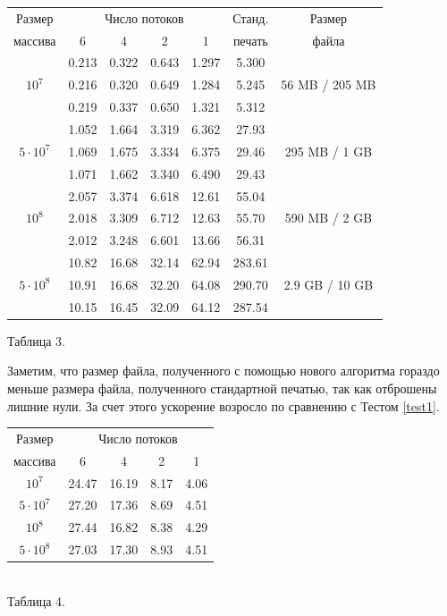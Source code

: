 \begin{center}
\begin{longtable}{||c|c|c|c|c|c|c||}
\hline
\hline
Размер & \multicolumn{4}{c|}{Число потоков} & Станд. & Размер\\
\hhline{~|-|-|-|-|~|~|}
массива & 6  & 4 & 2 & 1 & печать & файла\\
\hline
\hline
 & 0.213 & 0.322 & 0.643 & 1.297 & 5.300  &\\
\hhline{~|-|-|-|-|-|}
$10^7$ & 0.216 & 0.320 & 0.649 & 1.284 & 5.245  &56 MB / 205 MB \\
\hhline{~|-|-|-|-|-|}
 & 0.219 & 0.337 & 0.650 & 1.321 & 5.312  &\\
\hline
& 1.052 & 1.664 & 3.319 & 6.362 & 27.93  &\\
\hhline{~|-|-|-|-|-|}
$5 \cdot 10^7$& 1.069  & 1.675 & 3.334 & 6.375 & 29.46  &295 MB / 1 GB\\
\hhline{~|-|-|-|-|-|}
& 1.071  & 1.662 & 3.340 & 6.490 & 29.43  &\\
\hline
 & 2.057 &  3.374 & 6.618 & 12.61 & 55.04 & \\
\hhline{~|-|-|-|-|-|}
$10^8$ & 2.018 & 3.309 & 6.712 & 12.63 & 55.70  & 590 MB / 2 GB \\
\hhline{~|-|-|-|-|-|}
 & 2.012 & 3.248 & 6.601 & 13.66 & 56.31  &\\
\hline
 & 10.82 & 16.68 & 32.14 & 62.94 & 283.61  &\\
\hhline{~|-|-|-|-|-|}
$5 \cdot 10^8$ & 10.91 & 16.68 & 32.20 & 64.08 & 290.70  &2.9 GB / 10 GB\\
\hhline{~|-|-|-|-|-|}
 & 10.15 & 16.45 & 32.09 & 64.12 & 287.54  &\\
\hline
\hline
\end{longtable}
\small{Таблица 3.}
\end{center}

Заметим, что размер файла, полученного с помощью нового алгоритма гораздо меньше размера файла, полученного стандартной печатью, так как отброшены лишние нули.
За счет этого ускорение возросло по сравнению с Тестом \ref{test1}.

\begin{center}
\begin{tabular}{||c|c|c|c|c||}
\hline
\hline
Размер & \multicolumn{4}{c|}{Число потоков}\\
\hhline{~|-|-|-|-|}
массива & 6 & 4 & 2 & 1 \\
\hline
$10^7$  & 24.47  & 16.19 & 8.17 & 4.06 \\
\hline
$5 \cdot 10^7$ & 27.20 & 17.36& 8.69 & 4.51 \\
\hline
$10^8$ & 27.44 & 16.82 & 8.38 & 4.29 \\
\hline
$5 \cdot 10^8$ & 27.03  & 17.30 & 8.93& 4.51 \\
\hline
\hline
\end{tabular}
\\
\vspace{14pt}
\small{Таблица 4.}
\end{center}

